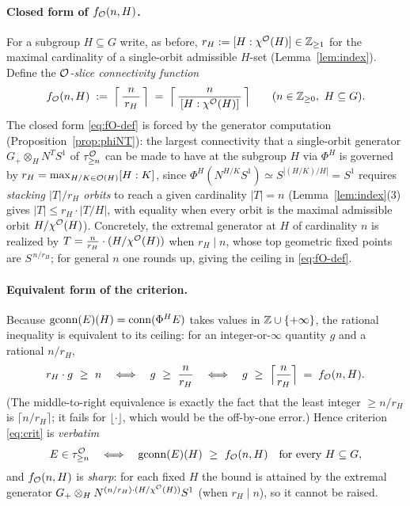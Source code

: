 \paragraph{Closed form of $f_{\mathcal{O}}(n,H)$.}
For a subgroup $H\subseteq G$ write, as before, $r_H:=[H:\chi^{\mathcal{O}}(H)]\in\mathbb{Z}_{\ge1}$
for the maximal cardinality of a single-orbit admissible $H$-set
(Lemma~\ref{lem:index}). Define the \emph{$\mathcal{O}$-slice connectivity function}
\begin{equation}\label{eq:fO-def}
f_{\mathcal{O}}(n,H)\;:=\;\Bigl\lceil\,\frac{n}{\,r_H\,}\,\Bigr\rceil
\;=\;\Bigl\lceil\,\frac{n}{\,[H:\chi^{\mathcal{O}}(H)]\,}\,\Bigr\rceil
\qquad(n\in\mathbb{Z}_{\ge0},\ H\subseteq G).
\end{equation}
The closed form \eqref{eq:fO-def} is forced by the generator computation
(Proposition~\ref{prop:phiNT}): the largest connectivity that a single-orbit
generator $G_+\otimes_H N^{T}S^1$ of $\tau^{\mathcal{O}}_{\ge n}$ can be made to have at
the subgroup $H$ via $\Phi^H$ is governed by $r_H=\max_{H/K\in\mathcal{O}(H)}[H:K]$,
since $\Phi^H(N^{H/K}S^1)\simeq S^{|(H/K)/H|}=S^{1}$ requires
\emph{stacking $|T|/r_H$ orbits} to reach a given cardinality $|T|=n$
(Lemma~\ref{lem:index}(3) gives $|T|\le r_H\cdot|T/H|$, with equality when every
orbit is the maximal admissible orbit $H/\chi^{\mathcal{O}}(H)$). Concretely, the
extremal generator at $H$ of cardinality $n$ is realized by
$T=\tfrac{n}{r_H}\cdot(H/\chi^{\mathcal{O}}(H))$ when $r_H\mid n$, whose top geometric
fixed points are $S^{\,n/r_H}$; for general $n$ one rounds up, giving the
ceiling in \eqref{eq:fO-def}.

\paragraph{Equivalent form of the criterion.}
Because $\operatorname{gconn}(E)(H)=\operatorname{conn}(\Phi^H E)$ takes values in
$\mathbb{Z}\cup\{+\infty\}$, the rational inequality is equivalent to its
ceiling: for an integer-or-$\infty$ quantity $g$ and a rational $n/r_H$,
\[
r_H\cdot g\ \ge\ n
\quad\Longleftrightarrow\quad
g\ \ge\ \frac{n}{r_H}
\quad\Longleftrightarrow\quad
g\ \ge\ \Bigl\lceil\frac{n}{r_H}\Bigr\rceil\;=\;f_\qfiveaO(n,H).
\]
(The middle-to-right equivalence is exactly the fact that the least integer
$\ge n/r_H$ is $\lceil n/r_H\rceil$; it fails for $\lfloor\cdot\rfloor$, which
would be the off-by-one error.) Hence criterion \eqref{eq:crit} is \emph{verbatim}
\begin{equation}\label{eq:crit-sharp}
E\in\tau^{\mathcal{O}}_{\ge n}
\quad\Longleftrightarrow\quad
\operatorname{gconn}(E)(H)\ \ge\ f_{\mathcal{O}}(n,H)
\quad\text{for every } H\subseteq G,
\end{equation}
and $f_{\mathcal{O}}(n,H)$ is \emph{sharp}: for each fixed $H$ the bound is attained by
the extremal generator $G_+\otimes_H N^{(n/r_H)\cdot(H/\chi^{\mathcal{O}}(H))}S^1$ (when
$r_H\mid n$), so it cannot be raised.

